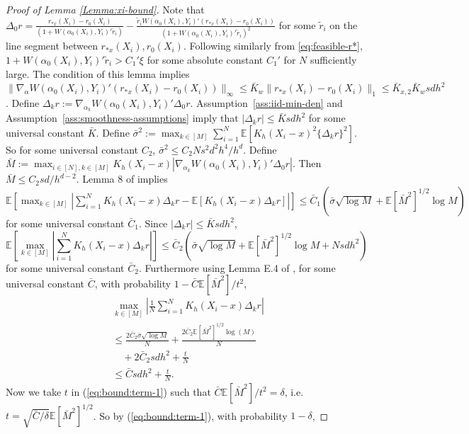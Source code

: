\documentclass[11pt]{article}
\begin{document}
\begin{proof}[Proof of Lemma \ref{Lemma:xi-bound}]
Note that $\Delta_0r=\frac{r_{*x}(X_i)-r_0(X_i)}{(1+W(\alpha_0(X_i),Y_i)'\tilde{r}_i)}-\frac{\tilde{r}_iW(\alpha_0(X_i),Y_i)'(r_{*x}(X_i)-r_0(X_i))}{(1+W(\alpha_0(X_i),Y_i)'\tilde{r}_i)^2}$ for some $\tilde{r}_i$ on the line segment between $r_{*x}(X_i), r_0(X_i)$. Following similarly from \eqref{eq:feasible-r*}, $1+W(\alpha_0(X_i),Y_i)'\tilde{r}_i>C_1'\xi$ for some absolute constant $C_1'$ for $N$ sufficiently large. The condition of this lemma implies $\|\nabla_{\alpha}W(\alpha_0(X_i),Y_i)'(r_{*x}(X_i)-r_0(X_i))\|_{\infty}\leq \bar{K}_w\|r_{*x}(X_i)-r_0(X_i)\|_1\leq\bar{K}_{x,2}\bar{K}_wsdh^2$. Define $\Delta_kr:=\nabla_{\alpha_k}W(\alpha_0(X_i),Y_i)'\Delta_0r$. Assumption~\ref{ass:iid-min-den} and Assumption~\ref{ass:smoothness-assumptions} imply that $|\Delta_kr|\leq\bar{K}sdh^2$ for some universal constant $\bar{K}$. Define $\bar \sigma^2:=\max_{k\in[M]}\sum_{i=1}^N\mathbb{E}\left[K_h(X_i-x)^2\{\Delta_kr\}^2\right]$. So for some universal constant $C_2$, $\bar{\sigma}^2\leq C_2Ns^2d^2h^4/h^d$. Define $\bar{M}:=  \max_{i\in[N],k\in[M]}K_h(X_i-x)|\nabla_{\alpha_k}W(\alpha_0(X_i),Y_i)'\Delta_0r|$. Then $\displaystyle\bar{M}\leq C_2sd/h^{d-2}$.
Lemma 8 of \citet{chernozhukov2015comparison} implies $\mathbb{E}\left[\max_{k\in[M]}\left|\sum_{i=1}^NK_h(X_i-x)\Delta_kr-\mathbb{E}[K_h(X_i-x)\Delta_kr]\right|\right]\leq\bar{C}_1\left(\bar{\sigma}\sqrt{\log M}+\mathbb{E}[\bar{M}^2]^{1/2}\log M\right)$ for some universal constant $\bar{C}_1$. Since $|\Delta_kr|\leq\bar{K}sdh^2$, 
$$\mathbb{E}[\max_{k\in[M]}|\sum_{i=1}^NK_h(X_i-x)\Delta_kr|]\leq\bar{C}_2\left(\bar{\sigma}\sqrt{\log M}+\mathbb{E}[\bar{M}^2]^{1/2}\log M+Nsdh^2\right)$$ 
for some universal constant $\bar{C}_2$. Furthermore using Lemma E.4 of \citet{chernozhukov2017central}, for some universal constant $\bar{C}$, with probability $1-\bar{C}\mathbb{E}[\bar M^2]/t^2$, 
\begin{equation}\label{eq:bound:term-1}
\begin{array}{rl}
&\displaystyle\max_{k\in[M]}\left|\frac{1}{N}\sum_{i=1}^NK_h(X_i-x)\Delta_kr\right|\\
&\displaystyle\leq\frac{2\bar{C}_2\bar\sigma \sqrt{\log M}}{N} + \frac{2\bar{C}_2\mathbb{E}[\bar{M}^2]^{1/2}\log(M)}{N}\\
&\displaystyle\quad+2\bar{C}_2sdh^2 + \frac{t}{N}\\
&\displaystyle \leq\bar{C}sdh^2 + \frac{t}{N}.
\end{array}
\end{equation}
Now we take $t$ in (\ref{eq:bound:term-1}) such that $\bar{C}\mathbb{E}[\bar M^2]/t^2=\delta$, i.e. $t=\sqrt{\bar{C}/\delta}\mathbb{E}[\bar{M}^2]^{1/2}$. So by (\ref{eq:bound:term-1}), with probability $1-\delta$, 

\end{proof}
\end{document}
